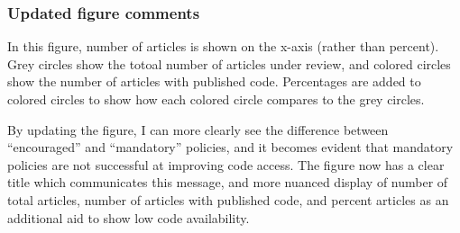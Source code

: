 \documentclass[
]{article}
\begin{document}
\hypertarget{updated-figure-comments}{%
\subsubsection{Updated figure comments}\label{updated-figure-comments}}

In this figure, number of articles is shown on the x-axis (rather than
percent). Grey circles show the totoal number of articles under review,
and colored circles show the number of articles with published code.
Percentages are added to colored circles to show how each colored circle
compares to the grey circles.

By updating the figure, I can more clearly see the difference between
``encouraged'' and ``mandatory'' policies, and it becomes evident that
mandatory policies are not successful at improving code access. The
figure now has a clear title which communicates this message, and more
nuanced display of number of total articles, number of articles with
published code, and percent articles as an additional aid to show low
code availability.
\end{document}
